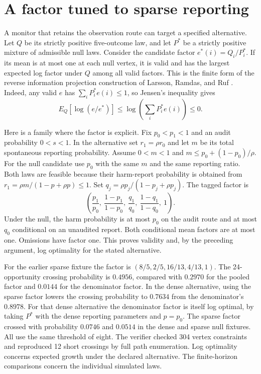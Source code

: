 \documentclass[11pt]{article}
\begin{document}
\section{A factor tuned to sparse reporting}
A monitor that retains the observation route can target a specified
alternative. Let $Q$ be its strictly positive five-outcome law, and
let $P^*$ be a strictly positive mixture of admissible null laws.
Consider the candidate factor $e^*(i)=Q_i/P_i^*$. If its mean is
at most one at each null vertex, it is valid and has the largest
expected log factor under $Q$ among all valid factors. This is
the finite form of the reverse information projection construction
of Larsson, Ramdas, and Ruf \cite{larsson}. Indeed, any valid $e$
has $\sum_i P_i^*e(i)\le1$, so Jensen's inequality gives
\[
 E_Q[\log(e/e^*)]\le \log\!\left(\sum_i P_i^*e(i)\right)\le0.
\]

Here is a family where the factor is explicit. Fix $p_0<p_1<1$ and
an audit probability $0<s<1$. In the alternative set $r_1=\rho r_0$
and let $m$ be its total spontaneous reporting probability. Assume
$0<m<1$ and $m\le p_0+(1-p_0)/\rho$. For the null candidate
use $p_0$ with the same $m$ and the same reporting ratio. Both laws
are feasible because their harm-report probability is obtained from
$r_1=\rho m/(1-p+\rho p)\le1$. Set
$q_j=\rho p_j/(1-p_j+\rho p_j)$. The tagged factor is
\[
 \left(\frac{p_1}{p_0},\ \frac{1-p_1}{1-p_0},\
       \frac{q_1}{q_0},\ \frac{1-q_1}{1-q_0},\ 1\right).
\]
Under the null, the harm probability is at most $p_0$ on the
audit route and at most $q_0$ conditional on an unaudited report.
Both conditional mean factors are at most one. Omissions have
factor one. This proves validity and, by the preceding argument,
log optimality for the stated alternative.

For the earlier sparse fixture the factor is
$(8/5,2/5,16/13,4/13,1)$. The 24-opportunity crossing
probability is $0.4956$, compared with $0.2970$ for the pooled
factor and $0.0144$ for the denominator factor. In the dense
alternative, using the sparse factor lowers the crossing probability
to $0.7634$ from the denominator's $0.8978$. For that dense
alternative the denominator factor is itself log optimal, by
taking $P^*$ with the dense reporting parameters and $p=p_0$.
The sparse factor crossed with probability $0.0746$ and $0.0514$
in the dense and sparse null fixtures. All use the same threshold
of eight. The verifier checked 304 vertex constraints and reproduced
12 short crossings by full path enumeration. Log optimality
concerns expected growth under the declared alternative. The
finite-horizon comparisons concern the individual simulated laws.
\end{document}
